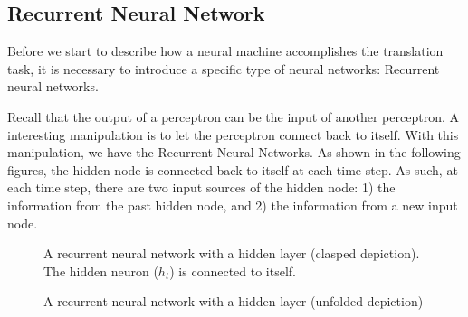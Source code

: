\documentclass[final]{ua-thesis}
\numberwithin{equation}{section}
\begin{document}
\subsection{Recurrent Neural Network}

Before we start to describe how a neural machine accomplishes the translation task, it is necessary to introduce a specific type of neural networks: Recurrent neural networks. 

Recall that the output of a perceptron can be the input of another perceptron. A interesting manipulation is to let the perceptron connect back to itself. With this manipulation, we have the Recurrent Neural Networks. As shown in the following figures, the hidden node is connected back to itself at each time step. As such, at each time step, there are two input sources of the hidden node: 1) the information from the past hidden node, and 2) the information from a new input node.       

\begin{figure}
\caption{A recurrent neural network with a hidden layer (clasped depiction). The hidden neuron ($h_{t}$) is connected to itself.}
\centering
{}
\end{figure}

\begin{figure}
\caption{A recurrent neural network with a hidden layer (unfolded depiction)}
\centering
{}
\end{figure}
\end{document}
